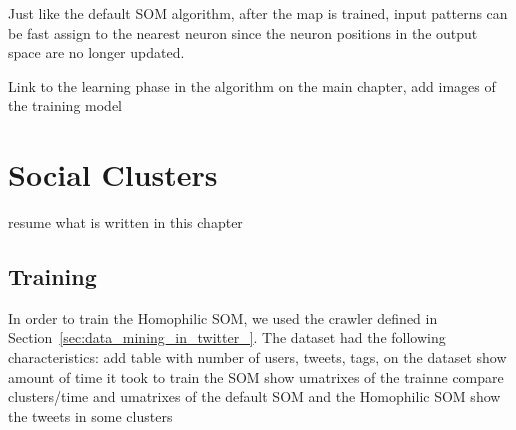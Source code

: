 Just like the default \ac{SOM} algorithm, after the map is trained, input patterns can be fast assign to the nearest neuron since the neuron positions in the output space are no longer updated.

{\color{red} Link to the learning phase in the algorithm on the main chapter, add images of the training model }

\section{Social Clusters}
\label{sec:hmophilic_som_clusters}
{\color{red} resume what is written in this chapter }

\subsection{Training}
\label{sub:dataset}
In order to train the Homophilic SOM, we used the crawler defined in Section~\ref{sec:data_mining_in_twitter_}. The dataset had the following characteristics:
{\color{red} add table with number of users, tweets, tags, on the dataset}
{\color{red} show amount of time it took to train the SOM}
{\color{red} show umatrixes of the trainne }
{\color{red} compare clusters/time and umatrixes of the default SOM and the Homophilic SOM}
{\color{red} show the tweets in some clusters }


